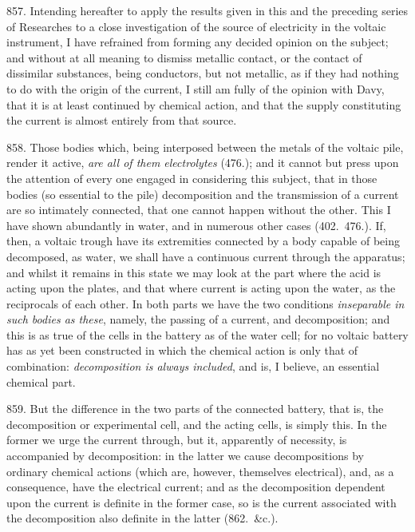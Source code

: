 857. Intending hereafter to apply the results given in this and the
preceding series of Researches to a close investigation of the source of
electricity in the voltaic instrument, I have refrained from forming any
decided opinion on the subject; and without at all meaning to dismiss
metallic contact, or the contact of dissimilar substances, being
conductors, but not metallic, as if they had nothing to do with the
origin of the current, I still am fully of the opinion with Davy, that
it is at least continued by chemical action, and that the supply
constituting the current is almost entirely from that source.

858. Those bodies which, being interposed between the metals of the
voltaic pile, render it active, \emph{are all of them electrolytes}
(476.); and it cannot but press upon the attention of every one engaged
in considering this subject, that in those bodies (so essential to the
pile) de\-com\-po\-si\-tion and the transmission of a current are so intimately
connected, that one cannot happen without the other. This I have shown
abundantly in water, and in numerous other cases (402.\ 476.). If, then,
a voltaic trough have its extremities connected by a body capable of
being de\-com\-posed, as water, we shall have a continuous current through
the ap\-pa\-ra\-tus; and whilst it remains in this state we may look at the
part where the acid is acting upon the plates, and that where current is
acting upon the water, as the reciprocals of each other. In both parts
we have the two conditions \emph{inseparable in such bodies as these},
namely, the passing of a current, and de\-com\-po\-si\-tion; and this is as true
of the cells in the battery as of the water cell; for no voltaic battery
has as yet been constructed in which the chemical action is only that of
combination: \emph{de\-com\-po\-si\-tion is always included}, and is, I believe,
an essential chemical part.

859. But the difference in the two parts of the connected battery, that
is, the de\-com\-po\-si\-tion or experimental cell, and the acting cells, is
simply this. In the former we urge the current through, but it,
apparently of necessity, is accompanied by de\-com\-po\-si\-tion: in the latter
we cause de\-com\-po\-si\-tions by ordinary chemical actions (which are,
however, themselves electrical), and, as a consequence, have the
electrical current; and as the de\-com\-po\-si\-tion dependent upon the current
is definite in the former case, so is the current associated with the
de\-com\-po\-si\-tion also definite in the latter (862.\ \&c.).

